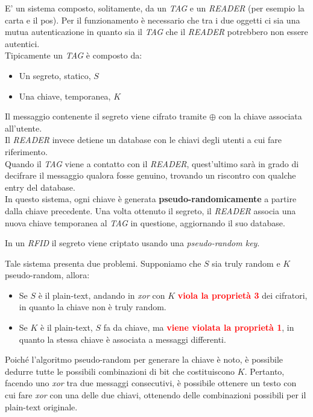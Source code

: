 \begin{example}[ RFID:]
E' un sistema composto, solitamente, da un \emph{TAG} e un \emph{READER} (per esempio la carta e il pos). Per il funzionamento è necessario che tra i due oggetti ci sia una mutua autenticazione in quanto sia il \emph{TAG} che il \emph{READER} potrebbero non essere autentici.\\
Tipicamente un \emph{TAG} è composto da:
\begin{itemize}
    \item Un segreto, statico, $S$
    \item Una chiave, temporanea, $K$
\end{itemize}
Il messaggio contenente il segreto viene cifrato tramite $\oplus$ con la chiave associata all'utente.\\
Il \emph{READER} invece detiene un database con le chiavi degli utenti a cui fare riferimento.\\
Quando il \emph{TAG} viene a contatto con il \emph{READER}, quest'ultimo sarà in grado di decifrare il messaggio qualora fosse genuino, trovando un riscontro con qualche entry del database.\\
In questo sistema, ogni chiave è generata \textbf{pseudo-randomicamente} a partire dalla chiave precedente. Una volta ottenuto il segreto, il \emph{READER} associa una nuova chiave temporanea al \emph{TAG} in questione, aggiornando il suo database.\\\pagebreak
\begin{remark}
In un \emph{RFID} il segreto viene criptato usando una \emph{pseudo-random key}.
\end{remark}
Tale sistema presenta due problemi. Supponiamo che $S$ sia truly random e $K$ pseudo-random, allora:
\begin{itemize}
    \item Se $S$ è il plain-text, andando in \emph{xor} con $K$ \textcolor{red}{\textbf{viola la proprietà 3}} dei cifratori, in quanto la chiave non è truly random.
    \item Se $K$ è il plain-text, $S$ fa da chiave, ma \textcolor{red}{\textbf{viene violata la proprietà 1}}, in quanto la stessa chiave è associata a messaggi differenti.
\end{itemize}
Poiché l'algoritmo pseudo-random per generare la chiave è noto, è possibile dedurre tutte le possibili combinazioni di bit che costituiscono $K$. Pertanto, facendo uno \emph{xor} tra due messaggi consecutivi, è possibile ottenere un testo con cui fare \emph{xor} con una delle due chiavi, ottenendo delle combinazioni possibili per il plain-text originale.\\

\end{example}
